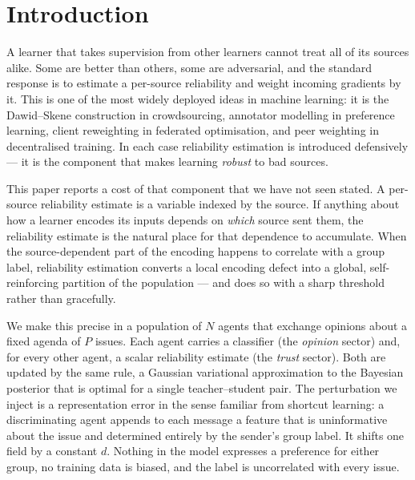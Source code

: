 \section{Introduction}
\label{sec:intro}

A learner that takes supervision from other learners cannot treat all of its
sources alike. Some are better than others, some are adversarial, and the
standard response is to estimate a per-source reliability and weight incoming
gradients by it. This is one of the most widely deployed ideas in machine
learning: it is the Dawid--Skene construction in crowdsourcing, annotator
modelling in preference learning, client reweighting in federated optimisation,
and peer weighting in decentralised training. In each case reliability estimation
is introduced defensively --- it is the component that makes learning
\emph{robust} to bad sources.

This paper reports a cost of that component that we have not seen stated. A
per-source reliability estimate is a variable indexed by the source. If anything
about how a learner encodes its inputs depends on \emph{which} source sent them,
the reliability estimate is the natural place for that dependence to accumulate.
When the source-dependent part of the encoding happens to correlate with a group
label, reliability estimation converts a local encoding defect into a global,
self-reinforcing partition of the population --- and does so with a sharp
threshold rather than gracefully.

We make this precise in a population of $N$ agents that exchange opinions about a
fixed agenda of $P$ issues. Each agent carries a classifier (the \emph{opinion}
sector) and, for every other agent, a scalar reliability estimate (the
\emph{trust} sector). Both are updated by the same rule, a Gaussian variational
approximation to the Bayesian posterior that is optimal for a single
teacher--student pair. The perturbation we inject is a representation error in
the sense familiar from shortcut learning: a discriminating agent appends to each
message a feature that is uninformative about the issue and determined entirely by
the sender's group label. It shifts one field by a constant $d$. Nothing in the
model expresses a preference for either group, no training data is biased, and
the label is uncorrelated with every issue.

